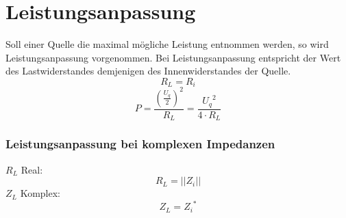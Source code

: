 



\section{Leistungsanpassung}
Soll einer Quelle die maximal mögliche Leistung entnommen werden, so wird 
Leistungsanpassung vorgenommen. Bei Leistungsanpassung entspricht der Wert des 
Lastwiderstandes demjenigen des Innenwiderstandes der Quelle. 
\[ R_L = R_i \]
\[ P = \frac{\left(\frac{U_q}{2}\right)^2}{R_L} = \frac{{U_q}^2}{4 \cdot R_L} \]

\subsubsection{Leistungsanpassung bei komplexen Impedanzen}
$R_L$ Real: 
\[ R_L = ||Z_i|| \]
$Z_L$ Komplex: 
\[ Z_L = {Z_i}^* \]

